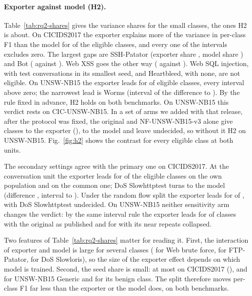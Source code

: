 \documentclass[pdflatex,sn-mathphys-num]{sn-jnl}
\newcommand{\cicids}{CICIDS2017}
\theoremstyle{thmstyleone}%
\theoremstyle{thmstylethree}%
\begin{document}
\paragraph{Exporter against model (H2).} Table~\ref{tab:rq2-shares} gives the variance shares for the small classes, the ones H2 is about. On \cicids{} the exporter explains more of the variance in per-class F1 than the model for \RQtwoExporterAboveCic{} of the \RQtwoEligibleCic{} eligible classes, and every one of the \RQtwoExporterAboveCic{} intervals excludes zero. The largest gaps are SSH-Patator (exporter share \RQtwoSshArm{}, model share \RQtwoSshModel{}) and Bot (\RQtwoBotArm{} against \RQtwoBotModel{}). Web XSS goes the other way (\RQtwoXssArm{} against \RQtwoXssModel{}). Web SQL injection, with \RQtwoSqliTest{} test conversations in its smallest seed, and Heartbleed, with none, are not eligible. On UNSW-NB15 the exporter leads for \RQtwoExporterAboveUnsw{} of \RQtwoEligibleUnsw{} eligible classes, every interval above zero; the narrowest lead is Worms (interval of the difference \RQtwoWormsLo{} to \RQtwoWormsHi{}). By the rule fixed in advance, H2 holds on both benchmarks. On UNSW-NB15 this verdict rests on CIC-UNSW-NB15. In a set of arms we added with that release, after the protocol was fixed, the original and NF-UNSW-NB15-v3 alone give \RQtwoUnswWithoutCicLeadN{} classes to the exporter (\RQtwoUnswWithoutCicLead{}), \RQtwoUnswWithoutCicModel{} to the model and leave \RQtwoUnswWithoutCicUndecided{} undecided, so without it H2 \RQtwoUnswWithoutCicHtwo{} on UNSW-NB15. Fig.~\ref{fig:h2} shows the contrast for every eligible class at both units.

The secondary settings agree with the primary one on \cicids{}. At the conversation unit the exporter leads for \RQtwoExporterAboveConvOwn{} of the \RQtwoEligibleCic{} eligible classes on the own population and \RQtwoExporterAboveConvCommon{} on the common one; DoS Slowhttptest turns to the model (difference \RQtwoSlowhttpConv{}, interval \RQtwoSlowhttpConvLo{} to \RQtwoSlowhttpConvHi{}). Under the random flow split the exporter leads for \RQtwoExporterAboveRandomOwn{} of \RQtwoEligibleCic{}, with DoS Slowhttptest undecided. On UNSW-NB15 neither sensitivity arm changes the verdict: by the same interval rule the exporter leads for \RQtwoUnswReleasedLeadN{} of \RQtwoEligibleUnsw{} classes with the original as published and for \RQtwoUnswCollapsedLeadN{} with its near repeats collapsed.

Two features of Table~\ref{tab:rq2-shares} matter for reading it. First, the interaction of exporter and model is large for several classes (\RQtwoInterWebBf{} for Web brute force, \RQtwoInterFtp{} for FTP-Patator, \RQtwoInterSlowloris{} for DoS Slowloris), so the size of the exporter effect depends on which model is trained. Second, the seed share is small: at most \RQtwoSeedCicMax{} on \cicids{} (\RQtwoSeedCicMaxClass{}), and \RQtwoSeedUnswGeneric{} for UNSW-NB15 Generic and \RQtwoSeedUnswBenign{} for its benign class. The split therefore moves per-class F1 far less than the exporter or the model does, on both benchmarks.
\end{document}
